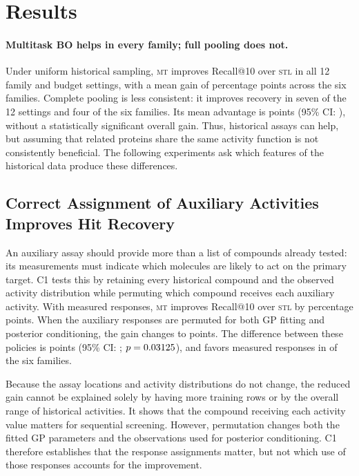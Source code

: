 \documentclass[10pt,letterpaper,runningheads]{llncs}
\newcommand{\stl}{\textsc{stl}}
\newcommand{\mt}{\textsc{mt}}
\begin{document}
\section{Results}
\label{sec:results}

\paragraph{Multitask BO helps in every family; full pooling does not.}
Under uniform historical sampling, \mt{} improves Recall@10 over
\stl{} in all 12 family and budget settings, with a mean gain of
\valMtUniform{} percentage points across the six families. Complete
pooling is less consistent: it improves recovery in seven of the
12 settings and four of the six families. Its mean advantage is
\valPooledUniform{} points (95\% CI: \ciPooledUniform{}), without
a statistically significant overall gain. Thus, historical assays can
help, but assuming that related proteins share the same activity
function is not consistently beneficial. The following experiments
ask which features of the historical data produce these differences.

\subsection{Correct Assignment of Auxiliary Activities Improves Hit Recovery}
\label{sec:res-null}

An auxiliary assay should provide more than a list of compounds already
tested: its measurements must indicate which molecules are likely to
act on the primary target. C1 tests this by retaining every historical
compound and the observed activity distribution while permuting which
compound receives each auxiliary activity. With measured responses,
\mt{} improves Recall@10 over \stl{} by \crossMeasuredGain{}
percentage points. When the auxiliary responses are permuted for both
GP fitting and posterior conditioning, the gain changes to
\crossPermutedGain{} points. The difference between these policies
is \crossPrimary{} points (95\% CI: \crossPrimaryCi{};
$p=0.03125{}$), and favors measured responses in
\crossPrimaryPositive{} of the six families.

Because the assay locations and activity distributions do not change,
the reduced gain cannot be explained solely by having more training
rows or by the overall range of historical activities. It shows that
the compound receiving each activity value matters for sequential
screening. However, permutation changes both the fitted GP parameters
and the observations used for posterior conditioning. C1 therefore
establishes that the response assignments matter, but not which use
of those responses accounts for the improvement.
\end{document}
